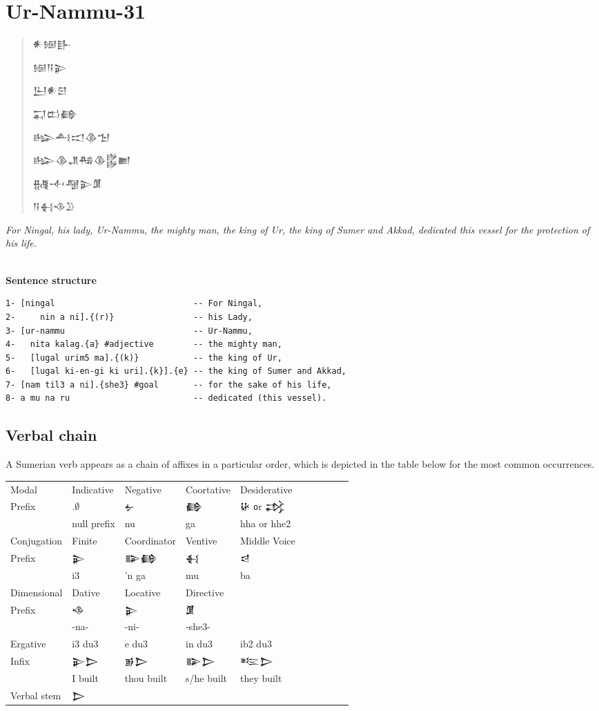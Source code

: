 \documentclass[a4paper,12pt]{book}
\newcommand{\fsm}{\Large\setmainfont{Akkadian.otf}}
\begin{document}
\chapter{Ur-Nammu-31}
\begin{quotation}\fsm
𒀭𒎏𒃲
  
𒎏𒀀𒉌

𒌨𒀭𒇉

𒍑𒆗𒂵

𒈗𒋀𒀊𒆠𒈠

𒈗𒆠𒂗𒄀𒆠𒌵𒆤

𒉆𒋾𒆷𒉌𒂠

𒀀𒈬𒈾𒊒
\end{quotation}
{\em For Ningal, his lady, Ur-Nammu,
  the mighty man, the king of Ur,
  the king of Sumer and Akkad,
  dedicated this vessel for the protection of his life.}

\verb||\\
{\large\bf Sentence structure}
\begin{verbatim}
1- [ningal                            -- For Ningal,
2-     nin a ni].{(r)}                -- his Lady,
3- [ur-nammu                          -- Ur-Nammu,
4-   nita kalag.{a} #adjective        -- the mighty man,
5-   [lugal urim5 ma].{(k)}           -- the king of Ur,
6-   [lugal ki-en-gi ki uri].{k}].{e} -- the king of Sumer and Akkad,
7- [nam til3 a ni].{she3} #goal       -- for the sake of his life,
8- a mu na ru                         -- dedicated (this vessel).
\end{verbatim}

\newpage
\section{Verbal chain}
A Sumerian verb appears
as a chain of affixes in a particular order,
which is depicted in the table below for
the most common occurrences.\\

\noindent
\begin{tabular}[!h]{|l | l | l | l | l | l l l l l}
  \hline
  Modal  & Indicative & Negative
  & Coortative & Desiderative\\
  Prefix&$.\emptyset$ &\fsm 𒉡 &\fsm 𒂵 &\fsm 𒄩
       {\texttt or} 𒃶\\
  & null prefix & nu & ga & hha or hhe2\\
  \hline
  Conjugation  & Finite & Coordinator & Ventive & Middle Voice\\
  Prefix&\fsm 𒉌 &\fsm 𒅔𒂵 &\fsm 𒈬 &\fsm 𒁀\\
  & i3 & 'n ga & mu & ba\\
  \hline
  Dimensional & Dative &Locative &Directive &\\
  Prefix &\fsm 𒈾&\fsm 𒉌 &\fsm 𒂠 & \\
  & -na- & -ni- & -she3- &\\
  \hline
  Ergative & i3 du3 & e du3 & in du3 & ib2 du3 \\
  Infix   &\fsm 𒉌𒆕&\fsm 𒂊𒆕 &\fsm 𒅔𒆕 &\fsm 𒌈𒆕\\
  &I built & thou built & s/he built & they built\\
  \hline
  Verbal stem &\multicolumn{4}{l|}{\fsm 𒆕}\\
  \hline
\end{tabular}
\end{document}
